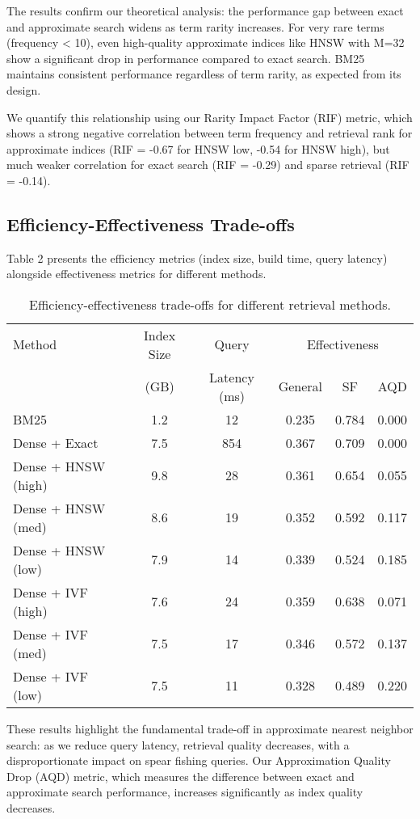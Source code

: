\documentclass[sigconf,review]{acmart}
\begin{document}
The results confirm our theoretical analysis: the performance gap between exact and approximate search widens as term rarity increases. For very rare terms (frequency < 10), even high-quality approximate indices like HNSW with M=32 show a significant drop in performance compared to exact search. BM25 maintains consistent performance regardless of term rarity, as expected from its design.

We quantify this relationship using our Rarity Impact Factor (RIF) metric, which shows a strong negative correlation between term frequency and retrieval rank for approximate indices (RIF = -0.67 for HNSW low, -0.54 for HNSW high), but much weaker correlation for exact search (RIF = -0.29) and sparse retrieval (RIF = -0.14).

\subsection{Efficiency-Effectiveness Trade-offs}
Table 2 presents the efficiency metrics (index size, build time, query latency) alongside effectiveness metrics for different methods.

\begin{table}[h]
\centering
\caption{Efficiency-effectiveness trade-offs for different retrieval methods.}
\begin{tabular}{lccccc}
\toprule
Method & Index Size & Query & \multicolumn{3}{c}{Effectiveness} \\
 & (GB) & Latency (ms) & General & SF & AQD \\
\midrule
BM25 & 1.2 & 12 & 0.235 & 0.784 & 0.000 \\
Dense + Exact & 7.5 & 854 & 0.367 & 0.709 & 0.000 \\
Dense + HNSW (high) & 9.8 & 28 & 0.361 & 0.654 & 0.055 \\
Dense + HNSW (med) & 8.6 & 19 & 0.352 & 0.592 & 0.117 \\
Dense + HNSW (low) & 7.9 & 14 & 0.339 & 0.524 & 0.185 \\
Dense + IVF (high) & 7.6 & 24 & 0.359 & 0.638 & 0.071 \\
Dense + IVF (med) & 7.5 & 17 & 0.346 & 0.572 & 0.137 \\
Dense + IVF (low) & 7.5 & 11 & 0.328 & 0.489 & 0.220 \\
\bottomrule
\end{tabular}
\end{table}

These results highlight the fundamental trade-off in approximate nearest neighbor search: as we reduce query latency, retrieval quality decreases, with a disproportionate impact on spear fishing queries. Our Approximation Quality Drop (AQD) metric, which measures the difference between exact and approximate search performance, increases significantly as index quality decreases.
\end{document}
